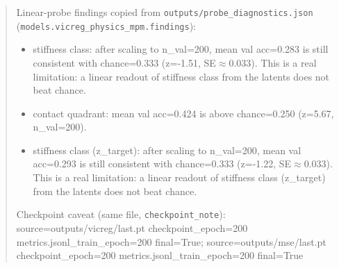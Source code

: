 \begin{quote}
\small
Linear-probe findings copied from \texttt{outputs/probe\_diagnostics.json} (\texttt{models.vicreg\_physics\_mpm.findings}):
\begin{itemize}\setlength{\itemsep}{2pt}\setlength{\parsep}{0pt}
    \item stiffness class: after scaling to n\_val=200, mean val acc=0.283 is still consistent with chance=0.333 (z=-1.51, SE$\approx$0.033). This is a real limitation: a linear readout of stiffness class from the latents does not beat chance.
    \item contact quadrant: mean val acc=0.424 is above chance=0.250 (z=5.67, n\_val=200).
    \item stiffness class (z\_target): after scaling to n\_val=200, mean val acc=0.293 is still consistent with chance=0.333 (z=-1.22, SE$\approx$0.033). This is a real limitation: a linear readout of stiffness class (z\_target) from the latents does not beat chance.
\end{itemize}
Checkpoint caveat (same file, \texttt{checkpoint\_note}): source=outputs/vicreg/last.pt checkpoint\_epoch=200 metrics.jsonl\_train\_epoch=200 final=True; source=outputs/mse/last.pt checkpoint\_epoch=200 metrics.jsonl\_train\_epoch=200 final=True
\end{quote}

